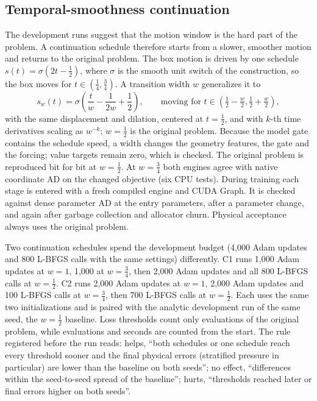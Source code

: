 \documentclass[11pt]{article}
\begin{document}
\subsection{Temporal-smoothness continuation}\label{sec:c36v3}
The development runs suggest that the motion window is the hard part of the
problem. A continuation schedule therefore starts from a slower, smoother
motion and returns to the original problem. The box motion is driven by one
schedule $s(t)=\sigma(2t-\tfrac12)$, where $\sigma$ is the smooth unit
switch of the construction, so the box moves for $t\in(\tfrac14,\tfrac34)$.
A transition width $w$ generalizes it to
\begin{equation}
s_w(t)=\sigma\!\left(\frac{t}{w}-\frac{1}{2w}+\frac12\right),\qquad
\text{moving for } t\in\left(\tfrac12-\tfrac w2,\tfrac12+\tfrac w2\right),
\label{eq:smoothness}
\end{equation}
with the same displacement and dilation, centered at $t=\tfrac12$, and with
$k$-th time derivatives scaling as $w^{-k}$; $w=\tfrac12$ is the original
problem. Because the model gate contains the schedule speed, a width changes
the geometry features, the gate and the forcing; value targets remain zero,
which is checked. The original problem is reproduced bit for bit at
$w=\tfrac12$. At $w=\tfrac34$ both engines agree with native coordinate AD on
the changed objective (six CPU tests). During training each stage is entered
with a fresh compiled engine and CUDA Graph. It is checked against dense
parameter AD at the entry parameters, after a parameter change, and again
after garbage collection and allocator churn. Physical acceptance always uses
the original problem.

Two continuation schedules spend the development budget (4,000 Adam updates
and 800 L-BFGS calls with the same settings) differently. C1 runs 1,000 Adam
updates at $w=1$, 1,000 at $w=\tfrac34$, then 2,000 Adam updates and all 800
L-BFGS calls at $w=\tfrac12$. C2 runs 2,000 Adam updates at $w=1$, 2,000 Adam
updates and 100 L-BFGS calls at $w=\tfrac34$, then 700 L-BFGS calls at
$w=\tfrac12$. Each uses the same two initializations and is paired with the
analytic development run of the same seed, the $w=\tfrac12$ baseline. Loss
thresholds count only evaluations of the original problem, while evaluations
and seconds are counted from the start. The rule registered before the run
reads: helps, ``both schedules or one schedule reach every threshold sooner
and the final physical errors (stratified pressure in particular) are lower
than the baseline on both seeds''; no effect, ``differences within the
seed-to-seed spread of the baseline''; hurts, ``thresholds reached later or
final errors higher on both seeds''.
\end{document}
